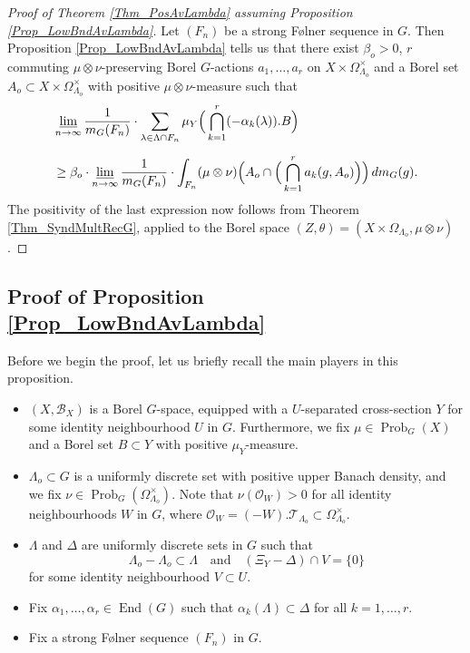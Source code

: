\documentclass[12pt,reqno,a4paper]{amsart}
\numberwithin{equation}{section}
\newcommand{\cO}{\mathcal{O}}
\newcommand{\cT}{\mathcal{T}}
\newcommand{\ra}{\rightarrow}
\newcommand{\qand}{\quad \textrm{and} \quad}
\DeclareMathOperator{\End}{End}
\DeclareMathOperator{\Prob}{Prob}
\theoremstyle{theorem}
\theoremstyle{task}
\theoremstyle{definition}
\begin{document}
\begin{proof}[Proof of Theorem \ref{Thm_PosAvLambda} assuming Proposition \ref{Prop_LowBndAvLambda}]
Let $(F_n)$ be a strong F\o lner sequence in $G$. Then Proposition \ref{Prop_LowBndAvLambda} tells us that there exist $\beta_o > 0$,
$r$ commuting $\mu \otimes \nu$-preserving Borel $G$-actions $a_1,\ldots,a_r$ on $X \times \Omega_{\Lambda_o}^{\times}$ and a Borel set $A_o \subset X \times \Omega_{\Lambda_o}^{\times}$
with positive $\mu \otimes \nu$-measure such that
\begin{align*}
&\varliminf_{n \ra \infty} \frac{1}{m_G(F_n)} \cdot \sum_{\lambda \in \Lambda \cap F_n}
\mu_Y\Big( \bigcap_{k=1}^r (-\alpha_k(\lambda)).B\Big)  \\[0.2cm]
&\geq \beta_o \cdot \varliminf_{n \ra \infty} \frac{1}{m_G(F_n)} \cdot
\int_{F_n} (\mu \otimes \nu)\Big(A_o \cap \Big( \bigcap_{k=1}^r a_k(g,A_o) \Big) \Big) \, dm_G(g).
\end{align*}
The positivity of the last expression now follows from Theorem \ref{Thm_SyndMultRecG},
applied to the Borel space $(Z,\theta) = (X \times \Omega_{\Lambda_o},\mu \otimes \nu)$.
\end{proof}

\subsection{Proof of Proposition \ref{Prop_LowBndAvLambda}}

\noindent Before we begin the proof, let us briefly recall the main players in this proposition.
\vspace{0.2cm}
\begin{itemize}
\item[(i)] $(X,\mathscr{B}_X)$ is a Borel $G$-space, equipped with a $U$-separated cross-section $Y$ for some identity neighbourhood $U$ in $G$. Furthermore, we fix $\mu \in \Prob_G(X)$ and a Borel set $B \subset Y$ with positive $\mu_Y$-measure. \vspace{0.2cm}
\item[(ii)] $\Lambda_o \subset G$ is a uniformly discrete set with positive upper Banach density, and we fix $\nu \in \Prob_G(\Omega_{\Lambda_o}^{\times})$. Note that
$\nu(\cO_{W}) > 0$ for all identity neighbourhoods $W$ in $G$, where $\cO_W = (-W).\cT_{\Lambda_o} \subset \Omega_{\Lambda_o}^{\times}$. \vspace{0.2cm}
\item[(iii)] $\Lambda$ and $\Delta$ are uniformly discrete sets in $G$ such that 
\[
\Lambda_o - \Lambda_o \subset \Lambda \qand (\Xi_Y - \Delta) \cap V = \{0\}
\]
for some identity neighbourhood $V \subset U$. \vspace{0.2cm}
\item[(iv)] Fix $\alpha_1,\ldots,\alpha_r \in \End(G)$ such that $\alpha_k(\Lambda) \subset \Delta$ for all $k=1,\ldots,r$. \vspace{0.2cm}
\item[(v)] Fix a strong F\o lner sequence $(F_n)$ in $G$.
\end{itemize}
\vspace{0.2cm}
\end{document}
